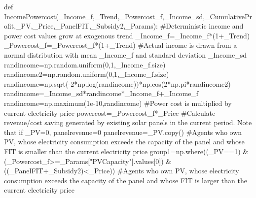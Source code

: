 \documentclass[
  letterpaper,
  DIV=11,
  numbers=noendperiod]{scrartcl}
\newenvironment{Shaded}{\begin{snugshade}}{\end{snugshade}}
\newcommand{\CommentTok}[1]{\textcolor[rgb]{0.37,0.37,0.37}{#1}}
\newcommand{\DecValTok}[1]{\textcolor[rgb]{0.68,0.00,0.00}{#1}}
\newcommand{\FloatTok}[1]{\textcolor[rgb]{0.68,0.00,0.00}{#1}}
\newcommand{\KeywordTok}[1]{\textcolor[rgb]{0.00,0.23,0.31}{#1}}
\newcommand{\NormalTok}[1]{\textcolor[rgb]{0.00,0.23,0.31}{#1}}
\newcommand{\OperatorTok}[1]{\textcolor[rgb]{0.37,0.37,0.37}{#1}}
\newcommand{\StringTok}[1]{\textcolor[rgb]{0.13,0.47,0.30}{#1}}
\begin{document}
\begin{Shaded}
\begin{Highlighting}[]
\KeywordTok{def}\NormalTok{ IncomePowercost(\_Income\_f,\_Trend,\_Powercost\_f,\_Income\_sd,\_CumulativeProfit,\_PV,\_Price,\_PanelFIT,\_Subsidy2,\_Params):}
    \CommentTok{\#Deterministic income and power cost values grow at exogenous trend}
\NormalTok{    \_Income\_f}\OperatorTok{=}\NormalTok{\_Income\_f}\OperatorTok{*}\NormalTok{(}\DecValTok{1}\OperatorTok{+}\NormalTok{\_Trend)}
\NormalTok{    \_Powercost\_f}\OperatorTok{=}\NormalTok{\_Powercost\_f}\OperatorTok{*}\NormalTok{(}\DecValTok{1}\OperatorTok{+}\NormalTok{\_Trend)}
    \CommentTok{\#Actual income is drawn from a normal distribution with mean \_Income\_f and standard deviation \_Income\_sd}
\NormalTok{    randincome}\OperatorTok{=}\NormalTok{np.random.uniform(}\DecValTok{0}\NormalTok{,}\DecValTok{1}\NormalTok{,\_Income\_f.size)}
\NormalTok{    randincome2}\OperatorTok{=}\NormalTok{np.random.uniform(}\DecValTok{0}\NormalTok{,}\DecValTok{1}\NormalTok{,\_Income\_f.size)}
\NormalTok{    randincome}\OperatorTok{=}\NormalTok{np.sqrt(}\OperatorTok{{-}}\DecValTok{2}\OperatorTok{*}\NormalTok{np.log(randincome))}\OperatorTok{*}\NormalTok{np.cos(}\DecValTok{2}\OperatorTok{*}\NormalTok{np.pi}\OperatorTok{*}\NormalTok{randincome2)}
\NormalTok{    randincome}\OperatorTok{=}\NormalTok{\_Income\_sd}\OperatorTok{*}\NormalTok{randincome}\OperatorTok{*}\NormalTok{\_Income\_f}\OperatorTok{+}\NormalTok{\_Income\_f}
\NormalTok{    randincome}\OperatorTok{=}\NormalTok{np.maximum(}\FloatTok{1e{-}10}\NormalTok{,randincome)}
    \CommentTok{\#Power cost is multiplied by current electricity price}
\NormalTok{    powercost}\OperatorTok{=}\NormalTok{\_Powercost\_f}\OperatorTok{*}\NormalTok{\_Price}
    \CommentTok{\#Calculate revenue/cost saving generated by existing solar panels in the current period. Note that if \_PV=0, panelrevenue=0}
\NormalTok{    panelrevenue}\OperatorTok{=}\NormalTok{\_PV.copy()}
    \CommentTok{\#Agents who own PV, whose electricity consumption exceeds the capacity of the panel and whose FIT is smaller than the current electricity price}
\NormalTok{    group1}\OperatorTok{=}\NormalTok{np.where((\_PV}\OperatorTok{==}\DecValTok{1}\NormalTok{) }\OperatorTok{\&}\NormalTok{ (\_Powercost\_f}\OperatorTok{\textgreater{}=}\NormalTok{\_Params[}\StringTok{"PVCapacity"}\NormalTok{].values[}\DecValTok{0}\NormalTok{]) }\OperatorTok{\&}\NormalTok{ ((\_PanelFIT}\OperatorTok{+}\NormalTok{\_Subsidy2)}\OperatorTok{\textless{}}\NormalTok{\_Price))}
    \CommentTok{\#Agents who own PV, whose electricity consumption exceeds the capacity of the panel and whose FIT is larger than the current electricity price}

\end{Highlighting}
\end{Shaded}
\end{document}
